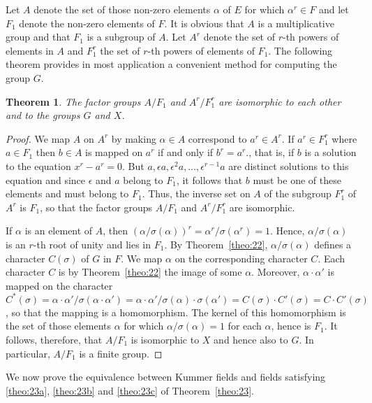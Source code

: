 \documentclass[10pt,leqno,a5paper]{book}
\newtheorem{theo}{Theorem}
\theoremstyle{definition}
\begin{document}
Let $A$ denote the set of those non-zero elements $\alpha$ of $E$ for which $\alpha^r \in F$ and let $F_1$ denote the non-zero elements of $F$.
It is obvious that $A$ is a multiplicative group and that $F_1$ is a subgroup of $A$.
Let $A^r$ denote the set of $r$-th powers of elements in $A$ and $F_1^r$ the set of $r$-th powers of elements of $F_1$.
The following theorem provides in most application a convenient method for computing the group $G$.


\begin{theo}
\label{theo:24}
The factor groups $A/F_1$ and $A^r/F_1^r$ are isomorphic to each other and to the groups $G$ and $X$.
\end{theo}

\begin{proof}
We map $A$ on $A^r$ by making $\alpha \in A$ correspond to $a^r \in A^r$.
If $a^r \in F_1^r$ where $a \in F_1$ then $b \in A$ is mapped on $a^r$ if and only if $b^r = a^r$., that is, if $b$ is a solution to the equation $x^r - a^r = 0$.
But $a, \epsilon a, \epsilon^2 a, \ldots, \epsilon^{r-1} a$ are distinct solutions to this equation and since $\epsilon$ and $a$ belong to $F_1$, it follows that $b$ must be one of these elements and must belong to $F_1$.
Thus, the inverse set on $A$ of the subgroup $F_1^r$ of $A^r$ is $F_1$, so that the factor groups $A/F_1$ and $A^r/F_1^r$ are isomorphic.

If $\alpha$ is an element of $A$, then $(\alpha / \sigma(\alpha))^r = \alpha^r / \sigma(\alpha^r) = 1$.
Hence, $\alpha / \sigma(\alpha)$ is an $r$-th root of unity and lies in $F_1$.
By Theorem~\ref{theo:22}, $\alpha / \sigma(\alpha)$ defines a character $C(\sigma)$ of $G$ in $F$.
We map $\alpha$ on the corresponding character $C$.
Each character $C$ is by Theorem~\ref{theo:22} the image of some $\alpha$.
Moreover, $\alpha \cdot \alpha'$ is mapped on the character $C^*(\sigma) = \alpha \cdot \alpha' / \sigma(\alpha \cdot \alpha') = \alpha \cdot \alpha' / \sigma(\alpha) \cdot \sigma(\alpha') = C(\sigma) \cdot C'(\sigma) = C \cdot C'(\sigma)$, so that the mapping is a homomorphism.
The kernel of this homomorphism is the set of those elements $\alpha$ for which $\alpha / \sigma(\alpha) = 1$ for each $\alpha$, hence is $F_1$.
It follows, therefore, that $A / F_1$ is isomorphic to $X$ and hence also to $G$.
In particular, $A/F_1$ is a finite group.
\end{proof}


We now prove the equivalence between Kummer fields and fields satisfying \eqref{theo:23a}, \eqref{theo:23b} and \eqref{theo:23c} of Theorem~\ref{theo:23}.
\end{document}
